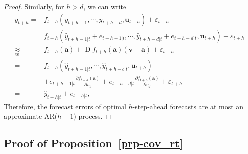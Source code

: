\documentclass[
  11pt,
  a4paper,
]{article}
\theoremstyle{plain}
\theoremstyle{remark}
\begin{document}
\begin{proof}
Similarly, for \(h > d\), we can write \[
\begin{aligned}
y_{t+h}
=&f_{t+h}(y_{t+h-1},\cdots,y_{t+h-d},\bm{u}_{t+h})+\varepsilon_{t+h} \\
=&f_{t+h}(\hat{y}_{t+h-1|t}+e_{t+h-1|t},\cdots,\hat{y}_{t+h-d|t}+e_{t+h-d|t},\bm{u}_{t+h})+\varepsilon_{t+h} \\
\underset{\text{te}}{\approx}&f_{t+h}(\bm{a})+\operatorname{D}f_{t+h}(\bm{a})(\bm{v}-\bm{a})+
\varepsilon_{t+h} \\
=&f_{t+h}(\hat{y}_{t+h-1|t},\cdots,\hat{y}_{t+h-d|t},\bm{u}_{t+h}) \\
&+e_{t+h-1|t}\frac{\partial f_{t+h}(\bm{a})}{\partial v_1}+e_{t+h-d|t}\frac{\partial f_{t+h}(\bm{a})}{\partial v_{d}}+\varepsilon_{t+h} \\
=&\hat{y}_{t+h|t}+e_{t+h|t},
\end{aligned}
\] Therefore, the forecast errors of optimal \(h\)-step-ahead forecasts
are at most an approximate AR(\(h-1\)) process.
\end{proof}

\subsection{\texorpdfstring{Proof of
Proposition~\ref{prp-cov_rt}}{Proof of Proposition~}}\label{sec-proof_cov_rt}
\end{document}
